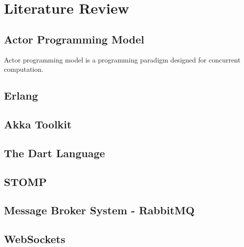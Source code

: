 \chapter{Literature Review}\label{chapter:literature_review}

\section{Actor Programming Model}
Actor programming model is a programming paradigm designed for concurrent computation.

\section{Erlang}

\section{Akka Toolkit}

\section{The Dart Language}

\section{STOMP}

\section{Message Broker System - RabbitMQ}

\section{WebSockets}
